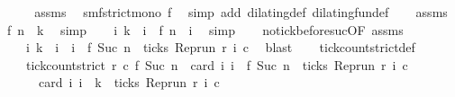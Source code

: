 \begin{isabellebody}
%
\isadelimproof
%
\endisadelimproof
%
\isatagproof
{}\isamarkupfalse%
\ {\isacharminus}\isanewline
\ \ \isamarkupfalse%
\ assms{\isacharparenleft}{}{\isacharparenright}\ \isamarkupfalse%
\ smf{\isacharcolon}{\isacartoucheopen}strict{\isacharunderscore}mono\ f{\isacartoucheclose}\ \isamarkupfalse%
\ {\isacharparenleft}simp\ add{\isacharcolon}\ dilating{\isacharunderscore}def\ dilating{\isacharunderscore}fun{\isacharunderscore}def{\isacharparenright}\isanewline
\ \ \isamarkupfalse%
\ assms{\isacharparenleft}{}{\isacharparenright}\ \isamarkupfalse%
\ {\isacartoucheopen}f\ n\ {\isacharless}\ k{\isacartoucheclose}\ \isamarkupfalse%
\ simp\isanewline
\ \ \isamarkupfalse%
\ {\isacartoucheopen}{\isasymforall}i{\isachardot}\ k\ {\isasymle}\ i\ {\isasymlongrightarrow}\ f\ n\ {\isacharless}\ i{\isacartoucheclose}\ \isamarkupfalse%
\ simp\isanewline
\ \ \isamarkupfalse%
\ no{\isacharunderscore}tick{\isacharunderscore}before{\isacharunderscore}suc{\isacharbrackleft}OF\ assms{\isacharparenleft}{}{\isacharparenright}{\isacharbrackright}\ \isamarkupfalse%
\isanewline
\ \ \ \ {\isacharasterisk}{\isacharcolon}{\isacartoucheopen}{\isasymforall}i{\isachardot}\ k\ {\isasymle}\ i\ {\isasymand}\ i\ {\isacharless}\ f\ {\isacharparenleft}Suc\ n{\isacharparenright}\ {\isasymlongrightarrow}\ {\isasymnot}ticks\ {\isacharparenleft}{\isacharparenleft}Rep{\isacharunderscore}run\ r{\isacharparenright}\ i\ c{\isacharparenright}{\isacartoucheclose}\ \isamarkupfalse%
\ blast\isanewline
\ \ \isamarkupfalse%
\ tick{\isacharunderscore}count{\isacharunderscore}strict{\isacharunderscore}def\ \isamarkupfalse%
\isanewline
\ \ \ \ {\isacartoucheopen}tick{\isacharunderscore}count{\isacharunderscore}strict\ r\ c\ {\isacharparenleft}f\ {\isacharparenleft}Suc\ n{\isacharparenright}{\isacharparenright}\ {\isacharequal}\ card\ {\isacharbraceleft}i{\isachardot}\ i\ {\isacharless}\ f\ {\isacharparenleft}Suc\ n{\isacharparenright}\ {\isasymand}\ ticks\ {\isacharparenleft}{\isacharparenleft}Rep{\isacharunderscore}run\ r{\isacharparenright}\ i\ c{\isacharparenright}{\isacharbraceright}{\isacartoucheclose}\ \isacommand{{\isachardot}}\isamarkupfalse%
\isanewline
\ \ \isamarkupfalse%
\ \isamarkupfalse%
\isanewline
\ \ \ \ {\isacartoucheopen}{\isachardot}{\isachardot}{\isachardot}\ {\isacharequal}\ card\ {\isacharbraceleft}i{\isachardot}\ i\ {\isacharless}\ k\ {\isasymand}\ ticks\ {\isacharparenleft}{\isacharparenleft}Rep{\isacharunderscore}run\ r{\isacharparenright}\ i\ c{\isacharparenright}{\isacharbraceright}\isanewline

\end{isabellebody}
